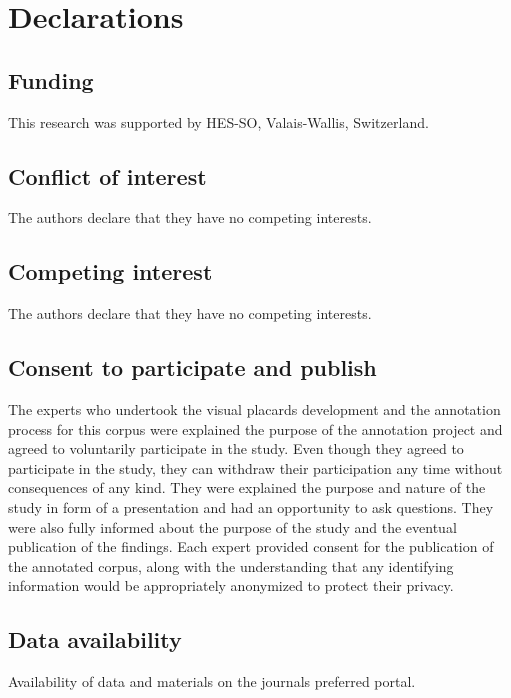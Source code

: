 \documentclass[sn-mathphys,Numbered]{sn-jnl}%
\theoremstyle{thmstyleone}%
\theoremstyle{thmstyletwo}%
\theoremstyle{thmstylethree}%
\begin{document}

%
%
%
\section*{Declarations}
%
\subsection*{Funding}
%
This research was supported by HES-SO, Valais-Wallis, Switzerland. 
%
%
%
\subsection*{Conflict of interest}
%
The authors declare that they have no competing interests.
%
%
%
\subsection*{Competing interest}
%
The authors declare that they have no competing interests.
%
%
%
%
%
%
%
\subsection*{Consent to participate and publish}
%
The experts who undertook the visual placards development and the annotation process for this corpus were explained the purpose of the annotation project and agreed to voluntarily participate in the study.
Even though they agreed to participate in the study, they can withdraw their participation any time without consequences of any kind.
They were explained the purpose and nature of the study in form of a presentation and had an opportunity to ask questions.
They were also fully informed about the purpose of the study and the eventual publication of the findings.
Each expert provided consent for the publication of the annotated corpus, along with the understanding that any identifying information would be appropriately anonymized to protect their privacy. 
%
%
%
\subsection*{Data availability}
%
Availability of data and materials on the journals preferred portal.
%
%
%
\end{document}
